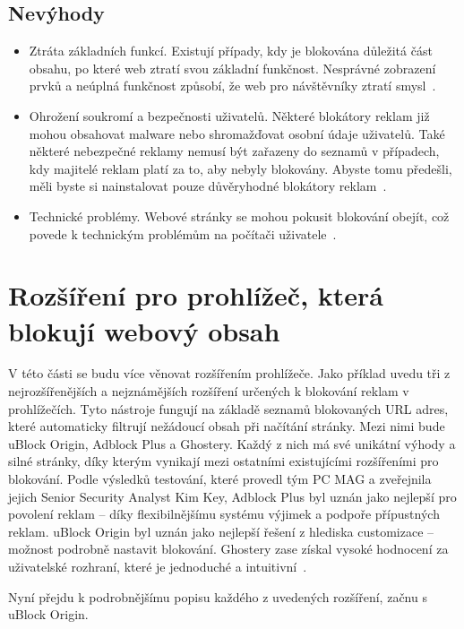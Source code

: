 \subsection*{Nevýhody}
\begin{itemize}
  \item{Ztráta základních funkcí. Existují případy, kdy je blokována důležitá část obsahu, po které web ztratí svou základní funkčnost. Nesprávné zobrazení prvků a neúplná funkčnost způsobí, že web pro návštěvníky ztratí smysl~\cite{adblock}. }
  \item{Ohrožení soukromí a bezpečnosti uživatelů. Některé blokátory reklam již mohou obsahovat malware nebo shromažďovat osobní údaje uživatelů. Také některé nebezpečné reklamy nemusí být zařazeny do seznamů v případech, kdy majitelé reklam platí za to, aby nebyly blokovány. Abyste tomu předešli, měli byste si nainstalovat pouze důvěryhodné blokátory reklam~\cite{adblock}.}
  \item{Technické problémy. Webové stránky se mohou pokusit blokování obejít, což povede k technickým problémům na počítači uživatele~\cite{adblock}.}
\end{itemize}

\section{Rozšíření pro prohlížeč, která blokují webový obsah}
V této části se budu více věnovat rozšířením prohlížeče. Jako příklad uvedu tři z nejrozšířenějších a nejznámějších rozšíření určených k blokování reklam v prohlížečích. Tyto nástroje fungují na základě seznamů blokovaných URL adres, které automaticky filtrují nežádoucí obsah při načítání stránky. Mezi nimi bude uBlock Origin, Adblock Plus a Ghostery. Každý z nich má své unikátní výhody a silné stránky, díky kterým vynikají mezi ostatními existujícími rozšířeními pro blokování. Podle výsledků testování, které provedl tým PC MAG a zveřejnila jejich Senior Security Analyst Kim Key, Adblock Plus byl uznán jako nejlepší pro povolení reklam -- díky flexibilnějšímu systému výjimek a podpoře přípustných reklam. uBlock Origin byl uznán jako nejlepší řešení z hlediska customizace -- možnost podrobně nastavit blokování. Ghostery zase získal vysoké hodnocení za uživatelské rozhraní, které je jednoduché a intuitivní~\cite{pcmag}.

Nyní přejdu k podrobnějšímu popisu každého z uvedených rozšíření, začnu s uBlock Origin.

